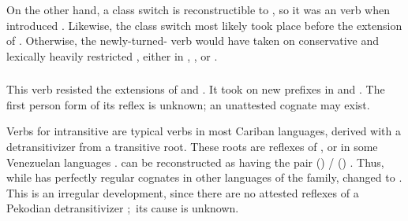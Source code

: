 On the other hand, a class switch is reconstructible to \PTir, so it was an  verb when \akuriyo introduced .
Likewise, the class switch most likely took place before the extension of \PPek {}.
Otherwise, the newly-turned- verb would have taken on conservative and lexically heavily restricted , either in \PPek, \PXin, or \arara.

\subsubsection{ }
\label{sec:bathe}
This verb resisted the extensions of \PPek {}  and \akuriyo {} .
It took on new  prefixes in \PTir {} and \PWai {}.
The first person form of its \carijo reflex  \parencites[72]{koch1908hiana} is unknown; an unattested \yukpa cognate may exist.

Verbs for intransitive  are typical  verbs in most Cariban languages, derived with a detransitivizer from a transitive root.
These roots are reflexes of , or  in some Venezuelan languages .
\PPek can be reconstructed as having the pair  () /  () .
Thus, while \PPek {} has perfectly regular cognates in other languages of the family,  changed  to .
This is an irregular development, since there are no attested reflexes of a Pekodian detransitivizer  \parencite[506]{meira2010origin}; its cause is unknown.




